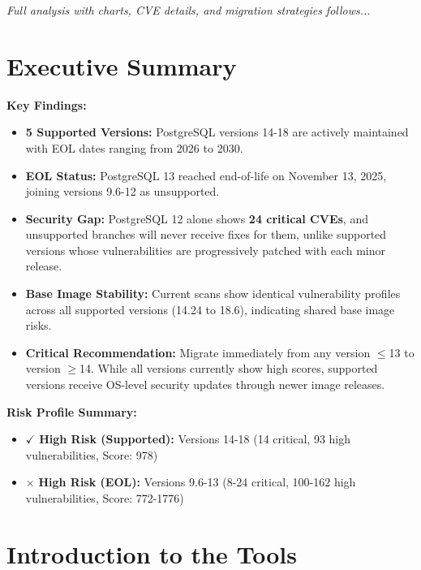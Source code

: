 \documentclass[11pt, a4paper]{article}
\begin{document}
\begin{center}
\textit{Full analysis with charts, CVE details, and migration strategies follows...}
\end{center}

\newpage

\section{Executive Summary}

\textbf{Key Findings:}

\begin{itemize}
    \item \textbf{\textcolor{gantt-supported}{5 Supported Versions:}} PostgreSQL versions 14-18 are actively maintained with EOL dates ranging from 2026 to 2030.
    \item \textbf{\textcolor{gantt-eol}{EOL Status:}} PostgreSQL 13 reached end-of-life on November 13, 2025, joining versions 9.6-12 as unsupported.
    \item \textbf{\textcolor{vuln-critical}{Security Gap:}} PostgreSQL 12 alone shows \textbf{\textcolor{vuln-critical}{24 critical CVEs}}, and unsupported branches will never receive fixes for them, unlike supported versions whose vulnerabilities are progressively patched with each minor release.
    \item \textbf{Base Image Stability:} Current scans show identical vulnerability profiles across all supported versions (14.24 to 18.6), indicating shared base image risks.
    \item \textbf{\textcolor{vuln-critical}{Critical Recommendation:}} Migrate immediately from any version $\leq$13 to version $\geq$14. While all versions currently show high scores, supported versions receive OS-level security updates through newer image releases.
\end{itemize}

\textbf{Risk Profile Summary:}
\begin{itemize}
    \item $\checkmark$ \textbf{\textcolor{vuln-high}{High Risk (Supported):}} Versions 14-18 (14 critical, 93 high vulnerabilities, Score: 978)
    \item $\times$ \textbf{\textcolor{vuln-critical}{High Risk (EOL):}} Versions 9.6-13 (8-24 critical, 100-162 high vulnerabilities, Score: 772-1776)
\end{itemize}

\section{Introduction to the Tools}
\end{document}
